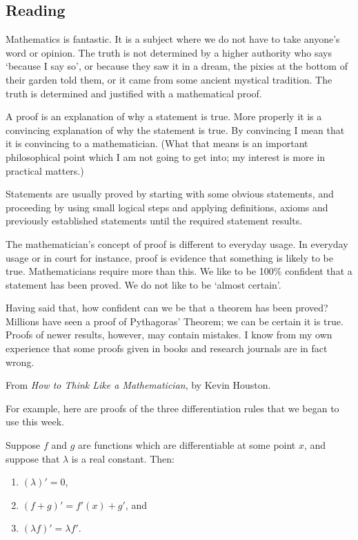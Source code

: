 


\subsection*{Reading}

Mathematics is fantastic. It is a subject where we do not have to take anyone’s word or
opinion. The truth is not determined by a higher authority who says ‘because I say so’,
or because they saw it in a dream, the pixies at the bottom of their garden told them, or
it came from some ancient mystical tradition. The truth is determined and justified with a
mathematical proof.

A proof is an explanation of why a statement is true. More properly it is a convincing
explanation of why the statement is true. By convincing I mean that it is convincing to
a mathematician. (What that means is an important philosophical point which I am not
going to get into; my interest is more in practical matters.)

Statements are usually proved by starting with some obvious statements, and proceeding
by using small logical steps and applying definitions, axioms and previously established
statements until the required statement results.

The mathematician’s concept of proof is different to everyday usage. In everyday usage
or in court for instance, proof is evidence that something is likely to be true. Mathematicians
require more than this. We like to be 100\% confident that a statement has been proved.
We do not like to be ‘almost certain’.

Having said that, how confident can we be that a theorem has been proved? Millions
have seen a proof of Pythagoras’ Theorem; we can be certain it is true. Proofs of newer
results, however, may contain mistakes. I know from my own experience that some proofs
given in books and research journals are in fact wrong.

\begin{flushright}
  From \textit{How to Think Like a Mathematician}, by Kevin Houston.
\end{flushright}

For example, here are proofs of the three differentiation rules that we began to use this week.

\begin{thm}
  Suppose $ f $ and $ g $ are functions which are differentiable at some point $ x $, and
  suppose that $ \lambda $ is a real constant. Then:
  \begin{enumerate}
    \item $ (\lambda)' = 0 $,
    \item $ (f + g)' = f'(x) + g' $, and
    \item $ (\lambda f)' = \lambda f' $.
  \end{enumerate}
\end{thm}

